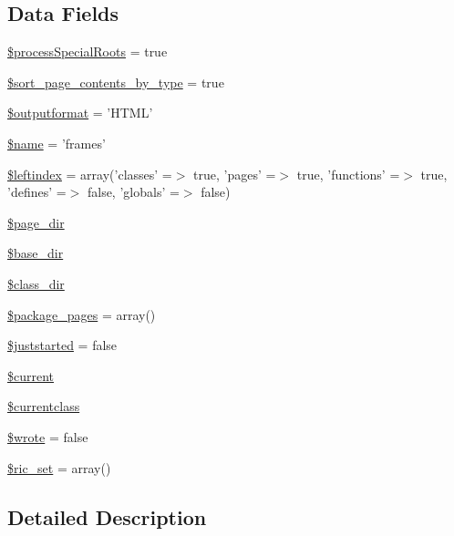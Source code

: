 \subsection*{\-Data \-Fields}
\begin{DoxyCompactItemize}
\item 
\hyperlink{class_h_t_m_lframes_converter_adcae2bdef17468fc5bf2f15981da497e}{\$process\-Special\-Roots} = true
\item 
\hyperlink{class_h_t_m_lframes_converter_ab5dae87e1968b35e37687a763216a835}{\$sort\-\_\-page\-\_\-contents\-\_\-by\-\_\-type} = true
\item 
\hyperlink{class_h_t_m_lframes_converter_af0bfe153c049d957e8ea29b147025108}{\$outputformat} = '\-H\-T\-M\-L'
\item 
\hyperlink{class_h_t_m_lframes_converter_ab2fc40d43824ea3e1ce5d86dee0d763b}{\$name} = 'frames'
\item 
\hyperlink{class_h_t_m_lframes_converter_ab49669c749559bb7833762878adb8f0c}{\$leftindex} = array('classes' =$>$ true, 'pages' =$>$ true, 'functions' =$>$ true, 'defines' =$>$ false, 'globals' =$>$ false)
\item 
\hyperlink{class_h_t_m_lframes_converter_ab554c658003c5e2653580ba881cd50eb}{\$page\-\_\-dir}
\item 
\hyperlink{class_h_t_m_lframes_converter_aa36f57c62963507498e1181f9a75bbb9}{\$base\-\_\-dir}
\item 
\hyperlink{class_h_t_m_lframes_converter_aaeaa82d379050faafbb4bf4b82733c94}{\$class\-\_\-dir}
\item 
\hyperlink{class_h_t_m_lframes_converter_acb916db0304b969918dbc0de762d45e0}{\$package\-\_\-pages} = array()
\item 
\hyperlink{class_h_t_m_lframes_converter_acb00e2d25525278b0592bfffe53bc4b6}{\$juststarted} = false
\item 
\hyperlink{class_h_t_m_lframes_converter_a2c4c58e377f6c66ca38c8ea97666fc5e}{\$current}
\item 
\hyperlink{class_h_t_m_lframes_converter_a14f3ccc5fc24cdb94ee022a77ef69c4d}{\$currentclass}
\item 
\hyperlink{class_h_t_m_lframes_converter_a2cf37faa5637b7639b816f3e61485a30}{\$wrote} = false
\item 
\hyperlink{class_h_t_m_lframes_converter_a84e3c5e32f1d02114c9d126d5864d06b}{\$ric\-\_\-set} = array()
\end{DoxyCompactItemize}


\subsection{\-Detailed \-Description}


